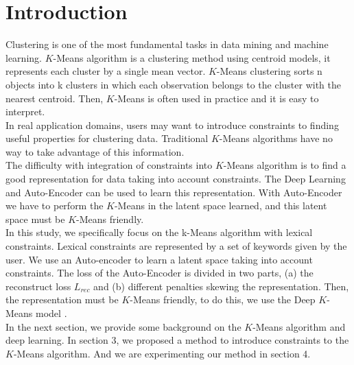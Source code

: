 \section{Introduction}\label{sec:intro}

Clustering is one of the most fundamental tasks in data mining and machine
learning. $K$-Means algorithm is a clustering method using centroid models,
it represents each cluster by a single mean vector. $K$-Means clustering sorts
n objects into k clusters in which each observation belongs to
the cluster with the nearest centroid.
Then, $K$-Means is often used in practice and it is easy to interpret. 
\\In real application domains, users may want to introduce constraints to finding 
useful properties for clustering data. Traditional $K$-Means algorithms 
have no way to take advantage of this information.
\\The difficulty with integration of constraints into $K$-Means
algorithm is to find a good representation for data  taking into
account constraints. The Deep Learning and Auto-Encoder can be used to
learn this representation. With Auto-Encoder we have to perform the
$K$-Means in the latent space learned, and this latent space must be
$K$-Means friendly.
\\In this study, we specifically focus on the k-Means algorithm with lexical constraints. Lexical constraints are represented
by a set of keywords given by the user. We use an Auto-encoder to learn a latent space taking
into account constraints. The loss of the Auto-Encoder is divided in two parts, (a) 
the reconstruct loss $L_{rec}$ and (b) different penalties skewing the
representation. Then, the representation must be $K$-Means friendly, 
to do this, we use the Deep $K$-Means model \cite{Deap-K-Means}.  
\\In the next section, we provide some background on the $K$-Means algorithm and
deep learning. In section 3, we proposed a method to introduce constraints to 
the $K$-Means algorithm. And we are experimenting our method in section 4.
